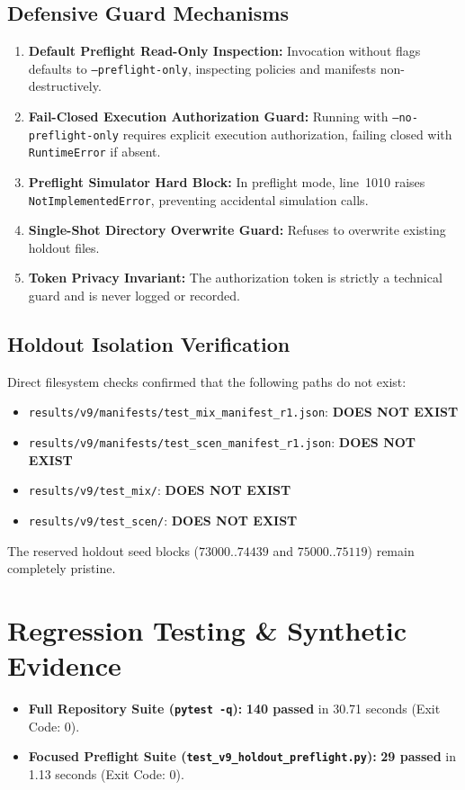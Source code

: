 \documentclass[10pt,a4paper]{article}
\begin{document}
\subsection{Defensive Guard Mechanisms}
\begin{enumerate}
    \item \textbf{Default Preflight Read-Only Inspection:} Invocation without flags defaults to \texttt{--preflight-only}, inspecting policies and manifests non-destructively.
    \item \textbf{Fail-Closed Execution Authorization Guard:} Running with \texttt{--no-preflight-only} requires explicit execution authorization, failing closed with \texttt{RuntimeError} if absent.
    \item \textbf{Preflight Simulator Hard Block:} In preflight mode, line~1010 raises \texttt{NotImplementedError}, preventing accidental simulation calls.
    \item \textbf{Single-Shot Directory Overwrite Guard:} Refuses to overwrite existing holdout files.
    \item \textbf{Token Privacy Invariant:} The authorization token is strictly a technical guard and is never logged or recorded.
\end{enumerate}

\subsection{Holdout Isolation Verification}
Direct filesystem checks confirmed that the following paths do not exist:
\begin{itemize}
    \item \texttt{results/v9/manifests/test\_mix\_manifest\_r1.json}: \textbf{DOES NOT EXIST}
    \item \texttt{results/v9/manifests/test\_scen\_manifest\_r1.json}: \textbf{DOES NOT EXIST}
    \item \texttt{results/v9/test\_mix/}: \textbf{DOES NOT EXIST}
    \item \texttt{results/v9/test\_scen/}: \textbf{DOES NOT EXIST}
\end{itemize}
The reserved holdout seed blocks ($73000..74439$ and $75000..75119$) remain completely pristine.

\section{Regression Testing \& Synthetic Evidence}
\begin{itemize}
    \item \textbf{Full Repository Suite (\texttt{pytest -q}):} \textbf{140 passed} in 30.71 seconds (Exit Code: 0).
    \item \textbf{Focused Preflight Suite (\texttt{test\_v9\_holdout\_preflight.py}):} \textbf{29 passed} in 1.13 seconds (Exit Code: 0).
\end{itemize}
\end{document}

